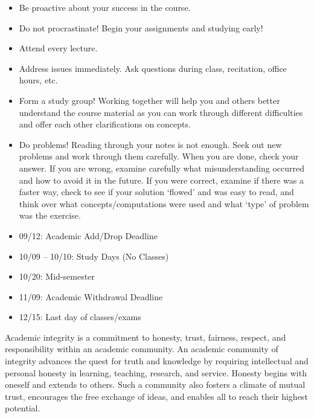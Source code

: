 \documentclass[11pt,letterpaper]{article}
\begin{document}
\begin{itemize} \itemsep=0.3ex
\item Be proactive about your success in the course.
\item Do not procrastinate! Begin your assignments and studying early!
\item Attend every lecture.
\item Address issues immediately. Ask questions during class, recitation, office hours, etc. 
\item Form a study group! Working together will help you and others better understand the course material as you can work through different difficulties and offer each other clarifications on concepts.
\item Do problems! Reading through your notes is not enough. Seek out new problems and work through them carefully. When you are done, check your answer. If you are wrong, examine carefully what misunderstanding occurred and how to avoid it in the future. If you were correct, examine if there was a faster way, check to see if your solution `flowed' and was easy to read, and think over what concepts/computations were used and what `type' of problem was the exercise.
\end{itemize}
\sectionbreak



\begin{itemize} \itemsep=0.3ex
\item 09/12: Academic Add/Drop Deadline
\item 10/09 -- 10/10: Study Days (No Classes)
\item 10/20: Mid-semester
\item 11/09: Academic Withdrawal Deadline
\item 12/15: Last day of classes/exams
\end{itemize}
\sectionbreak








Academic integrity is a commitment to honesty, trust, fairness, respect, and responsibility within an academic community. An academic community of integrity advances the quest for truth and knowledge by requiring intellectual and personal honesty in learning, teaching, research, and service. Honesty begins with oneself and extends to others. Such a community also fosters a climate of mutual trust, encourages the free exchange of ideas, and enables all to reach their highest potential. \pspace
\end{document}

